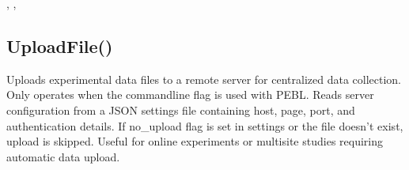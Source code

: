 \documentclass[letterpaper,10pt,english]{sphinxmanual}
\begin{document}
\sphinxAtStartPar
{}

\sphinxAtStartPar
{}, , 

\ignorespaces 

\subsection{UploadFile()}
\label{\detokenize{reference/utility:uploadfile}}\label{\detokenize{reference/utility:index-56}}
\sphinxAtStartPar
{}

\sphinxAtStartPar
{}

\sphinxAtStartPar
Uploads experimental data files to a remote server for centralized data collection. Only operates when the  command\sphinxhyphen{}line flag is used with PEBL. Reads server configuration from a JSON settings file containing host, page, port, and authentication details. If no\_upload flag is set in settings or the file doesn’t exist, upload is skipped. Useful for online experiments or multi\sphinxhyphen{}site studies requiring automatic data upload.

\sphinxAtStartPar
{}

\begin{sphinxVerbatim}[commandchars=\\\{\}]
\end{sphinxVerbatim}

\sphinxAtStartPar
{}
\end{document}
